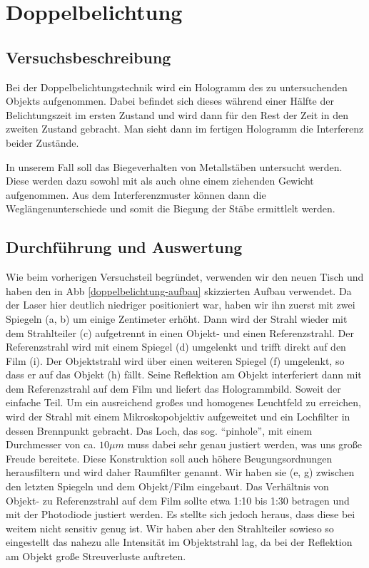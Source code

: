 \section{Doppelbelichtung}
\subsection{Versuchsbeschreibung}

Bei der Doppelbelichtungstechnik wird ein Hologramm des zu untersuchenden Objekts aufgenommen. Dabei befindet sich dieses während einer Hälfte der Belichtungszeit im ersten Zustand und wird dann für den Rest der Zeit in den zweiten Zustand gebracht. Man sieht dann im fertigen Hologramm die Interferenz beider Zustände.

In unserem Fall soll das Biegeverhalten von Metallstäben untersucht werden. Diese werden dazu sowohl mit als auch ohne einem ziehenden Gewicht aufgenommen. Aus dem Interferenzmuster können dann die Weglängenunterschiede und somit die Biegung der Stäbe ermittlelt werden. 

\subsection{Durchführung und Auswertung}

Wie beim vorherigen Versuchsteil begründet, verwenden wir den neuen Tisch und haben den in Abb \ref{doppelbelichtung-aufbau} skizzierten Aufbau verwendet. Da der Laser hier deutlich niedriger positioniert war, haben wir ihn zuerst mit zwei Spiegeln (a, b) um einige Zentimeter erhöht. Dann wird der Strahl wieder mit dem Strahlteiler (c) aufgetrennt in einen Objekt- und einen Referenzstrahl. Der Referenzstrahl wird mit einem Spiegel (d) umgelenkt und trifft direkt auf den Film (i). Der Objektstrahl wird über einen weiteren Spiegel (f) umgelenkt, so dass er auf das Objekt (h) fällt. Seine Reflektion am Objekt interferiert dann mit dem Referenzstrahl auf dem Film und liefert das Hologrammbild. Soweit der einfache Teil. Um ein ausreichend großes und homogenes Leuchtfeld zu erreichen, wird der Strahl mit einem Mikroskopobjektiv aufgeweitet und ein Lochfilter in dessen Brennpunkt gebracht. Das Loch, das sog. "`pinhole"', mit einem Durchmesser von ca. $10\mu m$ muss dabei sehr genau justiert werden, was uns große Freude bereitete. Diese Konstruktion soll auch höhere Beugungsordnungen herausfiltern und wird daher Raumfilter genannt. Wir haben sie (e, g) zwischen den letzten Spiegeln und dem Objekt/Film eingebaut. Das Verhältnis von Objekt- zu Referenzstrahl auf dem Film sollte etwa 1:10 bis 1:30 betragen und mit der Photodiode justiert werden. Es stellte sich jedoch heraus, dass diese bei weitem nicht sensitiv genug ist. Wir haben aber den Strahlteiler sowieso so eingestellt das nahezu alle Intensität im Objektstrahl lag, da bei der Reflektion am Objekt große Streuverluste auftreten. 

